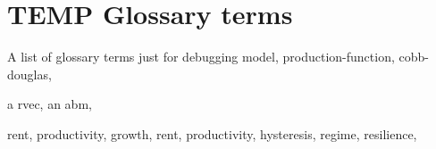 \section{TEMP Glossary terms}

A list of glossary terms just for debugging
\gls{model}, 
\gls{production-function}, 
\gls{cobb-douglas}, 

a \gls{rvec}, 
an \gls{abm}, 


\gls{rent}, 
\gls{productivity}, 
\gls{growth}, 
\gls{rent}, 
\gls{productivity}, 
\gls{hysteresis}, 
\gls{regime}, 
\gls{resilience}, 